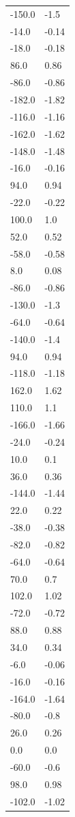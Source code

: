 \begin{longtable}{ll}
-150.0 & -1.5 \\
-14.0 & -0.14 \\
-18.0 & -0.18 \\
86.0 & 0.86 \\
-86.0 & -0.86 \\
-182.0 & -1.82 \\
-116.0 & -1.16 \\
-162.0 & -1.62 \\
-148.0 & -1.48 \\
-16.0 & -0.16 \\
94.0 & 0.94 \\
-22.0 & -0.22 \\
100.0 & 1.0 \\
52.0 & 0.52 \\
-58.0 & -0.58 \\
8.0 & 0.08 \\
-86.0 & -0.86 \\
-130.0 & -1.3 \\
-64.0 & -0.64 \\
-140.0 & -1.4 \\
94.0 & 0.94 \\
-118.0 & -1.18 \\
162.0 & 1.62 \\
110.0 & 1.1 \\
-166.0 & -1.66 \\
-24.0 & -0.24 \\
10.0 & 0.1 \\
36.0 & 0.36 \\
-144.0 & -1.44 \\
22.0 & 0.22 \\
-38.0 & -0.38 \\
-82.0 & -0.82 \\
-64.0 & -0.64 \\
70.0 & 0.7 \\
102.0 & 1.02 \\
-72.0 & -0.72 \\
88.0 & 0.88 \\
34.0 & 0.34 \\
-6.0 & -0.06 \\
-16.0 & -0.16 \\
-164.0 & -1.64 \\
-80.0 & -0.8 \\
26.0 & 0.26 \\
0.0 & 0.0 \\
-60.0 & -0.6 \\
98.0 & 0.98 \\
-102.0 & -1.02 \\

\end{longtable}

